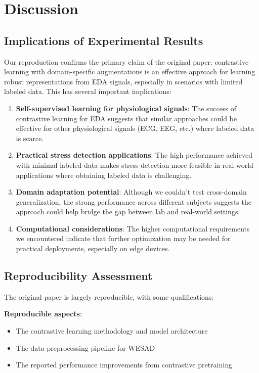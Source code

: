 \documentclass[10pt,letterpaper,twocolumn]{article}
\begin{document}
\section{Discussion}

\subsection{Implications of Experimental Results}

Our reproduction confirms the primary claim of the original paper: contrastive learning with domain-specific augmentations is an effective approach for learning robust representations from EDA signals, especially in scenarios with limited labeled data. This has several important implications:

\begin{enumerate}
    \item \textbf{Self-supervised learning for physiological signals}: The success of contrastive learning for EDA suggests that similar approaches could be effective for other physiological signals (ECG, EEG, etc.) where labeled data is scarce.
    
    \item \textbf{Practical stress detection applications}: The high performance achieved with minimal labeled data makes stress detection more feasible in real-world applications where obtaining labeled data is challenging.
    
    \item \textbf{Domain adaptation potential}: Although we couldn't test cross-domain generalization, the strong performance across different subjects suggests the approach could help bridge the gap between lab and real-world settings.
    
    \item \textbf{Computational considerations}: The higher computational requirements we encountered indicate that further optimization may be needed for practical deployments, especially on edge devices.
\end{enumerate}

\subsection{Reproducibility Assessment}

The original paper is largely reproducible, with some qualifications:

\textbf{Reproducible aspects}:
\begin{itemize}
    \item The contrastive learning methodology and model architecture
    \item The data preprocessing pipeline for WESAD
    \item The reported performance improvements from contrastive pretraining
\end{itemize}
\end{document}
